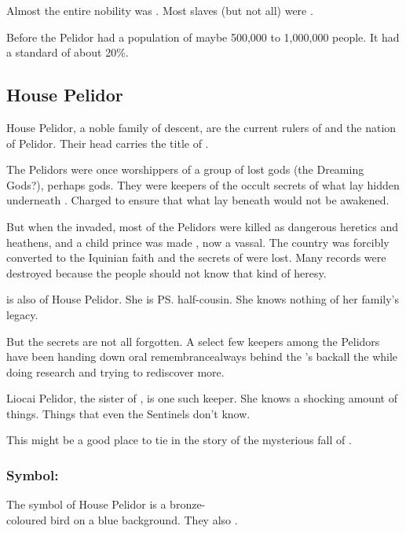 Almost the entire nobility was \scathaese. 
Most slaves (but not all) were \humans.

Before the \thirdbanewar Pelidor had a population of maybe 500,000 to 1,000,000 people. 
It had a standard  of about 20\%. 







\subsection{House Pelidor}
House Pelidor, a \scathaese{} noble family of \Tepharin{} descent, are the current rulers of \Malcur and the nation of Pelidor. 
Their head carries the title of \quo{\rayuth}.

The Pelidors were once worshippers of a group of lost gods (the Dreaming Gods?), perhaps \Tepharin{} gods. 
They were keepers of the occult secrets of what lay hidden underneath \Malcur. 
Charged to ensure that what lay beneath would not be awakened. 

But when the \Velcadians{} invaded, most of the Pelidors were killed as dangerous heretics and heathens, and a child prince was made \rayuth, now a \Velcadian{} vassal. The country was forcibly converted to the Iquinian faith and the secrets of \Malcur were lost. Many records were destroyed because the people should not know that kind of heresy. 

\Tiroco{} is also of House Pelidor. She is \ps{\Icor} half-cousin. She knows nothing of her family's legacy. 

But the secrets are not all forgotten. A select few keepers among the Pelidors have been handing down oral remembrance\dash always behind the \rayuth's back\dash all the while doing research and trying to rediscover more. 

Liocai Pelidor, the sister of \rayuth[\Icor], is one such keeper. She knows a shocking amount of things. Things that even the Sentinels don't know. 
 
This might be a good place to tie in the story of the mysterious fall of . 









\subsubsection{Symbol: \Grulcan}
The symbol of House Pelidor is a bronze-\\coloured {} bird on a blue background. They also . 









